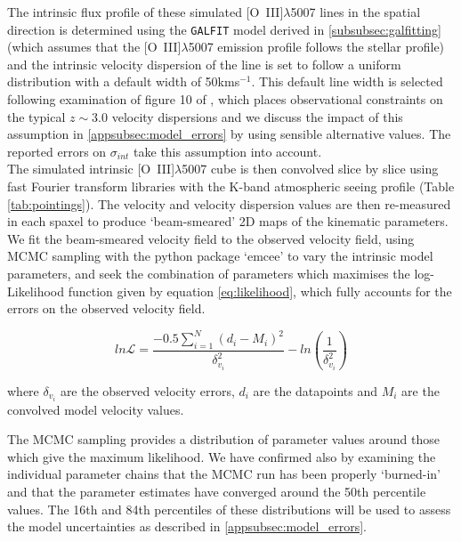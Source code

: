 \documentclass[fleqn,usenatbib]{mn2e}
\newcommand{\Lagr}{\mathcal{L}}
\begin{document}
The intrinsic flux profile of these simulated [O~{\sc III}]$\lambda$5007 lines in the spatial direction is determined using the {\tt GALFIT} model derived in \cref{subsubsec:galfitting} (which assumes that the [O~{\sc III}]$\lambda$5007 emission profile follows the stellar profile) and the intrinsic velocity dispersion of the line is set to follow a uniform distribution with a default width of 50kms$^{-1}$.
This default line width is selected following examination of figure 10 of \cite{Wisnioski2015}, which places observational constraints on the typical $z\sim3.0$ velocity dispersions and we discuss the impact of this assumption in \cref{appsubsec:model_errors} by using sensible alternative values.
The reported errors on $\sigma_{int}$ take this assumption into account. \\

The simulated intrinsic [O~{\sc III}]$\lambda$5007 cube is then convolved slice by slice using fast Fourier transform libraries with the K-band atmospheric seeing profile (Table \ref{tab:pointings}).
The velocity and velocity dispersion values are then re-measured in each spaxel to produce `beam-smeared' 2D maps of the kinematic parameters.
We fit the beam-smeared velocity field to the observed velocity field, using MCMC sampling with the python package `emcee' \citep{Foreman-Mackey2013} to vary the intrinsic model parameters, and seek the combination of parameters which maximises the log-Likelihood function given by equation \ref{eq:likelihood}, which fully accounts for the errors on the observed velocity field.

\begin{equation}\label{eq:likelihood}
   ln\Lagr = \frac{-0.5\sum_{i=1}^{N}(d_{i} - M_{i})^{2}}{\delta_{v_{i}}^{2}} - ln\left(\frac{1}{\delta_{v_{i}}^{2}}\right)
\end{equation}

\noindent
where $\delta_{v_{i}}$ are the observed velocity errors, $d_{i}$ are the datapoints and $M_{i}$ are the convolved model velocity values.

The MCMC sampling provides a distribution of parameter values around those which give the maximum likelihood.
We have confirmed also by examining the individual parameter chains that the MCMC run has been properly `burned-in' and that the parameter estimates have converged around the 50th percentile values.
The 16th and 84th percentiles of these distributions will be used to assess the model uncertainties as described in \cref{appsubsec:model_errors}.
\end{document}
